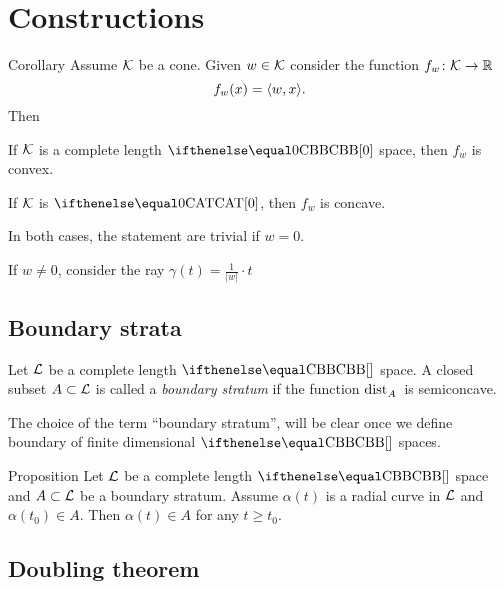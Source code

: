 \chapter{Constructions}


\begin{thm}{Corollary}
Assume $\mathcal{K}$ be a cone.
Given $w\in  \spc{K}$ consider 
the function $f_w\:\spc{K}\to\RR$
\[f_w(x)=\langle w,x\rangle.\]
Then

\begin{subthm}{}
If $\mathcal{K}$ is a complete length $\Alex0$ space, then $f_w$ is convex.
\end{subthm}

\begin{subthm}{}
If $\mathcal{K}$ is $\CAT0$, then $f_w$ is concave.
\end{subthm}
\end{thm}

In both cases, the statement are trivial if $w=0$.

If $w\ne 0$, consider the ray $\gamma(t)=\tfrac1{|w|}\cdot t$









\section{Boundary strata}
Let $\mathcal{L}$ be a complete length $\Alex{}$ space.
A closed subset $A\subset \spc{L}$ 
is called a 
\emph{boundary stratum} if the function $\mathop{\rm dist}\nolimits_{A}^{{}}{}{}$
is semiconcave.

The choice of the term ``boundary stratum'',
will be clear once we define boundary of finite dimensional $\Alex{}$ spaces.

\begin{thm}{Proposition}\label{prop:A-extremal}
Let $\mathcal{L}$ be a complete length $\Alex{}$ space and $A\subset \spc{L}$ 
be a boundary stratum.
Assume $\alpha(t)$ is a radial curve in $\mathcal{L}$ 
and $\alpha(t_0)\in A$.
Then $\alpha(t)\in A$ for any $t\ge t_0$. 
\end{thm}

\section{Doubling theorem}

